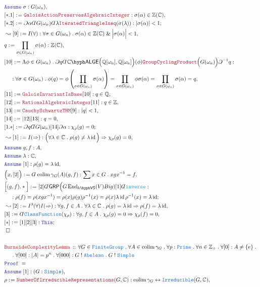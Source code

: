 \documentclass[12pt]{scrartcl}%
\newcommand{\TYPE}[1]{\textcolor{NavyBlue}{\mathtt{#1}}}%
\newcommand{\FUNC}[1]{\textcolor{Cerulean}{\mathtt{#1}}}%
\newcommand{\LOGIC}[1]{\textcolor{Blue}{\mathtt{#1}}}%
\newcommand{\THM}[1]{\textcolor{Maroon}{\mathtt{#1}}}%
\renewcommand{\.}{\; . \;} %
\newcommand{\de}{: \kern 0.1pc =} %
\newcommand{\IsNot}{\; ! \;} %
\newcommand{\Act}[1]{\left( #1 \right)} %
\newcommand{\Theorem}[2]{& \THM{#1} \, :: \, #2 \\ & \Proof = \\ } %
\newcommand{\NewLine}{\\ & \kern 1pc}%
\newcommand{\Page}[1]{ \begin{align*} #1 \end{align*}  }%
\newcommand{ \bd }{ \ByDef }%
\renewcommand{\And}{\; \& \;}%
\newcommand{\Imply}{\Rightarrow}
\newcommand{\Int}{\mathbb{Z}}%
\newcommand{\Complex}{\mathbb{C}}%
\newcommand{\Rats}{\mathbb{Q}}%
\DeclareMathOperator*{\id}{id}%
\newcommand{\End}{\mathrm{End}}%
\newcommand{\ToBij}{\leftrightarrow} %
\newcommand{\Say}[3]{& #1 \de #2 : #3, \\} %
\newcommand{\Conclude}[3]{& #1 \de #2 : #3; \\}%
\newcommand{\Derive}[3]{& \leadsto #1 \de #2 : #3, \\} %
\newcommand{\Assume}[2]{& \LOGIC{Assume} \; #1 : #2, \\} %
\newcommand{\QED}{\; \square} %
\newcommand{\EndProof}{& \QED \\} %
\newcommand{\ByDef}{\rotatebox[origin=c]{-180}{$D$}}%
\newcommand{\ByConstr}{\rotatebox[origin=c]{-180}{$C$}}%
\newcommand{\Proof}{\LOGIC{Proof} \; } %
\DeclareMathOperator*{\colim}{colim}%
\newcommand{\Abel}{\TYPE{Abelean}} %
\newcommand{\FG}{\TYPE{FiniteGroup}} %
\newcommand{\GRP}{\mathsf{GRP}} %
\newcommand{\VS}[1]{#1\hyph\mathsf{VS}} %
\newcommand{\LALGE}[1]{#1\hyph\mathsf{ALGE}}%
\begin{document}
{}\Page{
	\Assume{\sigma}{G(\omega_n)}
	\Say{[*.1]}{\THM{GaloisActionPreservesAlgebraicInteger}}{ \sigma( \alpha) \in \Int(\Complex)  }
	\Conclude{[*.2]}{ \ByConstr \alpha \bd G(\omega_n) \bd \lambda \THM{IteratedTriangleIneq}(\sigma(\lambda)) }
	{|\sigma(\alpha)| < 1}
	\Derive{[9]}{I(\forall)}
	{
		\forall \sigma \in G(\omega_n) \. 
		\sigma(\alpha) \in \Int(\Complex) \And \Big|\sigma(\alpha)\Big| < 1                                                  
	}
	\Say{q}{\prod_{\sigma \in G(\omega_n)} \sigma(\alpha) }{\Int(\Complex)}
	\Say{[10]}{
		\Lambda \phi \in G(\omega_n) \. 
		\ByConstr q
		\bd \LALGE{\Complex}\Big( \Rats[\omega_n], \Rats[\omega_n] \Big)(\phi) 
		\THM{GroupCyclingProduct}\Big( G(\omega_n) \Big) 
		\ByConstr^{-1} q
	}
	{
		\NewLine :
		\forall \sigma \in G(\omega_n) \.
		\phi(q) = 
		\phi\Act{ \prod_{\sigma \in G(\omega_n)} \sigma(\alpha ) } =
		\prod_{\sigma \in G(\omega_n)} \phi\sigma(\alpha) =
		\prod_{\sigma \in G(\omega_n)} \sigma(\alpha) =
		q
	}
	\Say{[11]}{\THM{GaloisInvariantIsBase}[10]}{q \in \Rats}
	\Say{[12]}{\THM{RationalAlgebraicInteger}[11]}{q \in \Int}
	\Say{[13]}{\THM{CauchySchwartzTHM}[9]}{|q|<1}
	\Say{[14]}{ |12||13| }{ q = 0}
	\Conclude{[1.*]}{\ByConstr q \bd G(\omega_n)[14]\ByConstr \alpha }{\chi_\rho(g) = 0}
	\Derive{[1]}{I(\Imply)}
	{
		\Big( 
			\forall \lambda \in \Complex \.
			\rho(g) \neq \lambda \id
		\Big) 
		\Imply
		\chi_\rho(g) = 0
	}
	\Assume{g,f}{A}
	\Assume{\lambda}{\Complex}
	\Assume{[1]}{ \rho(g) = \lambda \id }
	\Say{\Big(x,[2]\Big)}{\bd \colim \gamma_G(A)(g,f)}{\sum x \in G \. xgx^{-1} = f}
	\Conclude{ \Big[(g,f).*\Big] }{ [2]\bd \GRP\Big(G\,\End_{\VS{k}}(V)Big)[1]\bd \FUNC{inverse}}{ 
		\NewLine :
		\rho(f) =  
		\rho(xgx^{-1}) = 
		\rho(x)\rho(g)\rho^{-1}(x) =
		\rho(x)\lambda \id \rho^{-1}(x) =
		\lambda \id
	}
	\Derive{[2]}{I^3(\forall)I(\Imply)}
	{
		\forall g,f \in A \. \forall \lambda \in \Complex \. 
		\rho(g) = \lambda \id \Imply \rho(f) = \lambda \id
	}
	\Say{[3]}{\bd \TYPE{ClassFunction}(\chi_\rho)}
	{
		\forall g,f \in A \. \chi_\rho(g) = 0 \Imply \chi_\rho(f) = 0 
	}
	\Conclude{[*]}{[1][2][3]}{\LOGIC{This}}
	\EndProof
	\\
	\Theorem{BurnsideComplexityLemma}
	{
		\forall G \in \FG \.
		\forall A \in \colim \gamma_G \.
		\forall p : \TYPE{Prime} \.
		\forall n \in \Int_+ \.
		\forall [0] : A \neq \{e\} \.
		\NewLine \. 
		\forall [00] : |A| = p^n   \.
		\forall [000] : G \IsNot \Abel \.
		G \IsNot \TYPE{Simple}
	}
	\Assume{[1]}{(G:\TYPE{Simple})}
	\Say{\rho}{ \THM{NumberOfIrreducibleRepresentations}(G,\Complex)}
	{
		\colim \gamma_G  \ToBij \TYPE{Irreducible}(G,\Complex)
}}
\end{document}
